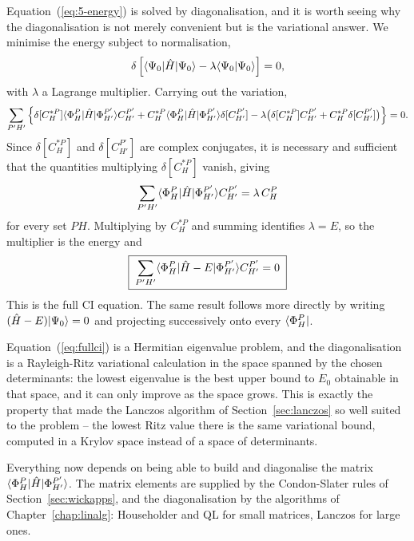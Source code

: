 Equation~(\ref{eq:5-energy}) is solved by diagonalisation, and it is worth
seeing why the diagonalisation is not merely convenient but is the
variational answer.  We minimise the energy subject to normalisation,
\begin{equation}
  \delta\left[\langle \Psi_0 | \hat{H} | \Psi_0 \rangle
    - \lambda\langle \Psi_0 \vert \Psi_0 \rangle\right] = 0,
  \label{eq:5-variation}
\end{equation}
with $\lambda$ a Lagrange multiplier.  Carrying out the variation,
\begin{equation}
  \sum_{P'H'}\Big\{\delta[C_H^{*P}]
    \langle \Phi_H^P | \hat{H} | \Phi_{H'}^{P'} \rangle C_{H'}^{P'}
  + C_H^{*P}\langle \Phi_H^P | \hat{H} | \Phi_{H'}^{P'} \rangle\delta[C_{H'}^{P'}]
  - \lambda\big(\delta[C_H^{*P}]C_{H'}^{P'}
    + C_H^{*P}\delta[C_{H'}^{P'}]\big)\Big\} = 0 .
  \label{eq:5-variation2}
\end{equation}
Since $\delta[C_H^{*P}]$ and $\delta[C_{H'}^{P'}]$ are complex conjugates, it
is necessary and sufficient that the quantities multiplying
$\delta[C_H^{*P}]$ vanish, giving
\begin{equation}
  \sum_{P'H'}\langle \Phi_H^P | \hat{H} | \Phi_{H'}^{P'} \rangle C_{H'}^{P'}
    = \lambda\,C_H^{P}
  \label{eq:5-eigen}
\end{equation}
for every set $PH$.  Multiplying by $C_H^{*P}$ and summing identifies
$\lambda=E$, so the multiplier is the energy and
\begin{equation}
  \boxed{\;
  \sum_{P'H'}\langle \Phi_H^P | \hat{H}-E | \Phi_{H'}^{P'} \rangle C_{H'}^{P'} = 0
  \;}
  \label{eq:fullci}
\end{equation}
This is the full CI equation.  The same result follows more directly by
writing $(\hat{H}-E)\vert \Psi_0 \rangle=0$ and projecting successively onto every
$\langle \Phi_H^P \vert$.

Equation~(\ref{eq:fullci}) is a Hermitian eigenvalue problem, and the
diagonalisation is a Rayleigh-Ritz variational calculation in the space
spanned by the chosen determinants: the lowest eigenvalue is the best upper
bound to $E_0$ obtainable in that space, and it can only improve as the space
grows.  This is exactly the property that made the Lanczos algorithm of
Section~\ref{sec:lanczos} so well suited to the problem -- the lowest Ritz
value there is the same variational bound, computed in a Krylov space instead
of a space of determinants.

Everything now depends on being able to build and diagonalise the matrix
$\langle \Phi_H^P | \hat{H} | \Phi_{H'}^{P'} \rangle$.  The matrix elements are
supplied by the Condon-Slater rules of Section~\ref{sec:wickapps}, and the
diagonalisation by the algorithms of Chapter~\ref{chap:linalg}: Householder
and QL for small matrices, Lanczos for large ones.

